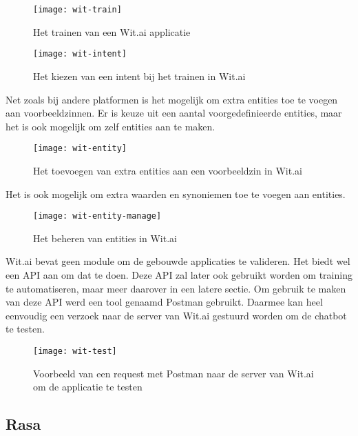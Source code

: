 \begin{figure}[H]
    \label{fig:wit-train}
    \centering
    \texttt{[image: wit-train]}
    \caption{Het trainen van een Wit.ai applicatie}
\end{figure}

\begin{figure}[H]
    \label{fig:wit-intent}
    \centering
    \texttt{[image: wit-intent]}
    \caption{Het kiezen van een intent bij het trainen in Wit.ai}
\end{figure}

Net zoals bij andere platformen is het mogelijk om extra entities toe te voegen aan voorbeeldzinnen. Er is keuze uit een aantal voorgedefinieerde entities, maar het is ook mogelijk om zelf entities aan te maken.

\begin{figure}[H]
    \label{fig:wit-entity}
    \centering
    \texttt{[image: wit-entity]}
    \caption{Het toevoegen van extra entities aan een voorbeeldzin in Wit.ai}
\end{figure}

Het is ook mogelijk om extra waarden en synoniemen toe te voegen aan entities.

\begin{figure}[H]
    \label{fig:wit-intent-manage}
    \centering
    \texttt{[image: wit-entity-manage]}
    \caption{Het beheren van entities in Wit.ai}
\end{figure}

Wit.ai bevat geen module om de gebouwde applicaties te valideren. Het biedt wel een API aan om dat te doen. Deze API zal later ook gebruikt worden om training te automatiseren, maar meer daarover in een latere sectie. Om gebruik te maken van deze API werd een tool genaamd Postman gebruikt. Daarmee kan heel eenvoudig een verzoek naar de server van Wit.ai gestuurd worden om de chatbot te testen.

\begin{figure}[H]
    \label{fig:wit-test}
    \centering
    \texttt{[image: wit-test]}
    \caption{Voorbeeld van een request met Postman naar de server van Wit.ai om de applicatie te testen}
\end{figure}

\subsection{Rasa}
\label{subsec:werking-platformen-rasa}

